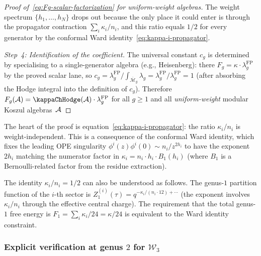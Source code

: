 \begin{proof}[Proof of~\eqref{eq:Fg-scalar-factorization}
for uniform-weight algebras]
The weight spectrum $\{h_1, \ldots, h_N\}$ drops out because
the only place it could enter is through the propagator
contraction $\sum_i \kappa_i/n_i$, and this ratio
equals $1/2$ for every generator by the conformal
Ward identity~\eqref{eq:kappa-i-propagator}.

\emph{Step~4: Identification of the coefficient.} The
universal constant $c_g$ is determined by specialising to a
single-generator algebra (e.g., Heisenberg): there
$F_g = \kappa \cdot \lambda_g^{\mathrm{FP}}$ by the proved
scalar lane, so $c_g = \lambda_g^{\mathrm{FP}} /
\int_{\overline{\mathcal{M}}_g} \lambda_g =
\lambda_g^{\mathrm{FP}} / \lambda_g^{\mathrm{FP}} = 1$ (after
absorbing the Hodge integral into the definition of $c_g$).
Therefore $F_g(\cA) = \kappaChHodge(\cA) \cdot \lambda_g^{\mathrm{FP}}$
for all $g \geq 1$ and all \emph{uniform-weight} modular Koszul
algebras~$\mathcal{A}$ %
\end{proof}

\begin{remark}
\label{rem:ward-equaliser}
The heart of the proof is equation~\eqref{eq:kappa-i-propagator}:
the ratio $\kappa_i/n_i$ is weight-independent. This is a
consequence of the conformal Ward identity, which fixes the
leading OPE singularity $\phi^i(z)\phi^i(0) \sim n_i/z^{2h_i}$
to have the exponent $2h_i$ matching the numerator factor in
$\kappa_i = n_i \cdot h_i \cdot B_1(h_i)$ (where $B_1$ is a
Bernoulli-related factor from the residue extraction).

The identity $\kappa_i / n_i = 1/2$ can also be understood as
follows. The genus-$1$ partition function of the $i$-th sector
is $Z_1^{(i)}(\tau) = q^{-\kappa_i/(n_i \cdot 12) + \cdots}$
(the exponent involves $\kappa_i/n_i$ through the effective
central charge). The requirement that the total genus-$1$ free
energy is $F_1 = \sum_i \kappa_i / 24 = \kappa/24$ is
equivalent to the Ward identity constraint.
\end{remark}

\subsubsection{Explicit verification at genus $2$ for
$\mathcal{W}_3$}

